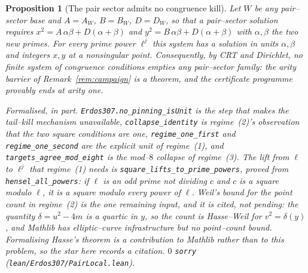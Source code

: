 \documentclass[11pt]{article}
\newtheorem{proposition}[theorem]{Proposition}
\theoremstyle{definition}
\begin{document}
\begin{proposition}[The pair sector admits no congruence kill]\label{prop:pairlocal}
Let $W$ be any pair--sector base and $A=A_W$, $B=B_W$, $D=D_W$, so that a pair--sector solution
requires $x^2=A\,\alpha\beta+D(\alpha+\beta)$ and $y^2=B\,\alpha\beta+D(\alpha+\beta)$ with
$\alpha,\beta$ the two new primes. For every prime power $\ell^j$ this system has a solution in
units $\alpha,\beta$ and integers $x,y$ at a nonsingular point. Consequently, by CRT and Dirichlet,
no finite system of congruence conditions empties any pair--sector family: the arity barrier of
Remark~\ref{rem:campaign} is a theorem, and the certificate programme provably ends at arity one.

\textup{Formalised, in part.} \texttt{Erdos307.no\_pinning\_isUnit} is the step that makes the
tail--kill mechanism unavailable, \texttt{collapse\_identity} is regime~\textup{(2)}'s
observation that the two square conditions are one, \texttt{regime\_one\_first} and
\texttt{regime\_one\_second} are the explicit unit of regime~\textup{(1)}, and
\texttt{targets\_agree\_mod\_eight} is the mod--$8$ collapse of regime~\textup{(3)}. The lift from
$\ell$ to $\ell^j$ that regime~\textup{(1)} needs is \texttt{square\_lifts\_to\_prime\_powers},
proved from \texttt{hensel\_all\_powers}: if $\ell$ is an odd prime not dividing $c$ and $c$ is a
square modulo $\ell$, it is a square modulo every power of $\ell$. Weil's bound for the point count
in regime~\textup{(2)} is the one remaining input, and it is \emph{cited}, not pending: the quantity
$\delta=u^2-4m$ is a quartic in $y$, so the count is Hasse--Weil for $v^2=\delta(y)$, and Mathlib has
elliptic--curve infrastructure but no point--count bound. Formalising Hasse's theorem is a
contribution to Mathlib rather than to this problem, so the star here records a citation. $0$
\texttt{sorry} \textup{(\texttt{lean/Erdos307/PairLocal.lean})}.
\end{proposition}
\end{document}
